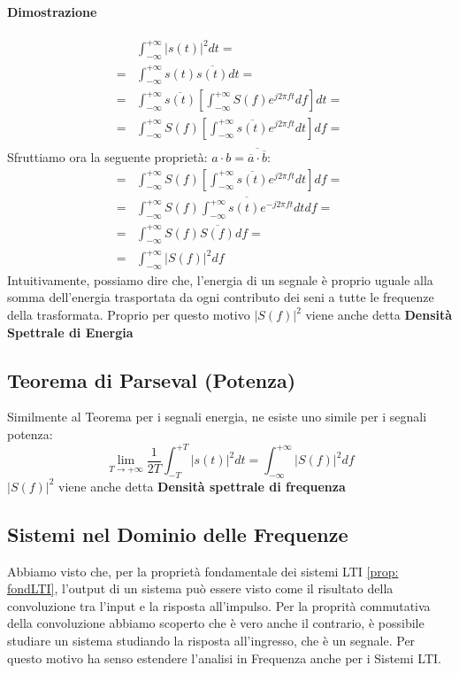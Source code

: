 \paragraph{Dimostrazione}
\begin{align*}
    &\int_{-\infty}^{+\infty} |s(t)|^2 dt = \\
    = &\int_{-\infty}^{+\infty} s(t) \overline{s(t)} dt= \\ \tag{per eq. di Sintesi}
    = &\int_{-\infty}^{+\infty} \overline{s(t)} \left[\int_{-\infty}^{+\infty} S(f) e^{j2 \pi ft}df \right] dt =\\
    = &\int_{-\infty}^{+\infty} S(f)  \left[\int_{-\infty}^{+\infty} \overline{s(t)}e^{j2 \pi ft}dt \right] df =\\
\end{align*}
Sfruttiamo ora la seguente proprietà: $a \cdot b = \overline{\overline{a} \cdot \overline{b}}$:
\begin{align*}
    = &\int_{-\infty}^{+\infty} S(f)  \left[\int_{-\infty}^{+\infty} \overline{s(t)}e^{j2 \pi ft}dt \right] df = \\
    = &\int_{-\infty}^{+\infty} S(f)  \overline{\int_{-\infty}^{+\infty} s(t) e^{-j2 \pi ft}}dt df = \\
    = &\int_{-\infty}^{+\infty} S(f) \overline{S(f)} df =\\
    = &\int_{-\infty}^{+\infty} |S(f)|^2df 
\end{align*}
Intuitivamente, possiamo dire che, l'energia di un segnale è proprio uguale alla somma dell'energia trasportata da ogni
contributo dei seni a tutte le frequenze della trasformata. Proprio per questo motivo $|S(f)|^2$ viene anche detta \textbf{Densità
Spettrale di Energia}

\subsection{Teorema di Parseval (Potenza)} 

Similmente al Teorema per i segnali energia, ne esiste uno simile per i segnali potenza:
\begin{equation}
    \lim_{T \to +\infty} \frac{1}{2T} \int_{-T}^{+T} |s(t)|^2 dt = \int_{-\infty}^{+\infty} |S(f)|^2df
\end{equation}
$|S(f)|^2$ viene anche detta \textbf{Densità spettrale di frequenza}


\subsection{Sistemi nel Dominio delle Frequenze}
Abbiamo visto che, per la proprietà fondamentale dei sistemi LTI \eqref{prop: fondLTI}, l'output di un sistema
può essere visto come il risultato della convoluzione tra l'input e la risposta all'impulso. Per la proprità 
commutativa della convoluzione abbiamo scoperto che è vero anche il contrario, è possibile studiare un sistema 
studiando la risposta all'ingresso, che è un segnale. Per questo motivo ha senso estendere l'analisi in Frequenza
anche per i Sistemi LTI.

